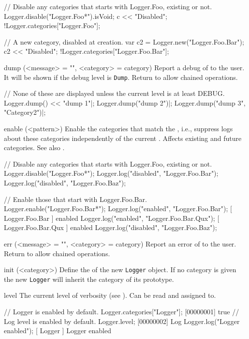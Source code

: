 \begin{urbiscriptapi}
\begin{urbiassert}
// Disable any categories that starts with Logger.Foo, existing or not.
Logger.disable("Logger.Foo*").isVoid;
c << "Disabled";
!Logger.categories["Logger.Foo"];

// A new category, disabled at creation.
var c2 = Logger.new("Logger.Foo.Bar");
c2 << "Disabled";
!Logger.categories["Logger.Foo.Bar"];
\end{urbiassert}


\item[dump](<message> = "", <category> = category)%
  Report a debug  of  to the user. It will be
  shown if the debug level is \lstinline|Dump|. Return \this to allow
  chained operations.
\begin{urbiunchecked}
// None of these are displayed unless the current level is at least DEBUG.
Logger.dump() << "dump 1"|;
Logger.dump("dump 2")|;
Logger.dump("dump 3", "Category2")|;
\end{urbiunchecked}


\item[enable](<pattern>)%
  Enable the categories that match the , i.e., suppress logs
  about these categories independently of the current .
  Affects existing and future categories.  See also .
\begin{urbiunchecked}
// Disable any categories that starts with Logger.Foo, existing or not.
Logger.disable("Logger.Foo*");
Logger.log("disabled", "Logger.Foo.Bar");
Logger.log("disabled", "Logger.Foo.Baz");

// Enable those that start with Logger.Foo.Bar.
Logger.enable("Logger.Foo.Bar*");
Logger.log("enabled", "Logger.Foo.Bar");
[    Logger.Foo.Bar     ] enabled
Logger.log("enabled", "Logger.Foo.Bar.Qux");
[  Logger.Foo.Bar.Qux   ] enabled
Logger.log("disabled", "Logger.Foo.Baz");
\end{urbiunchecked}


\item[err](<message> = "", <category> = category)%
  Report an error  of  to the user. Return \this
  to allow chained operations.


\item[init](<category>)%
  Define the  of the new \lstinline|Logger| object. If no
  category is given the new \lstinline|Logger| will inherit the category of
  its prototype.


\item[level]%
  The current level of verbosity (see ).  Can be read and
  assigned to.
\begin{urbiunchecked}
// Logger is enabled by default.
Logger.categories["Logger"];
[00000001] true
// Log level is enabled by default.
Logger.level;
[00000002] Log
Logger.log("Logger enabled");
[        Logger         ] Logger enabled


\end{urbiunchecked}
\end{urbiscriptapi}
